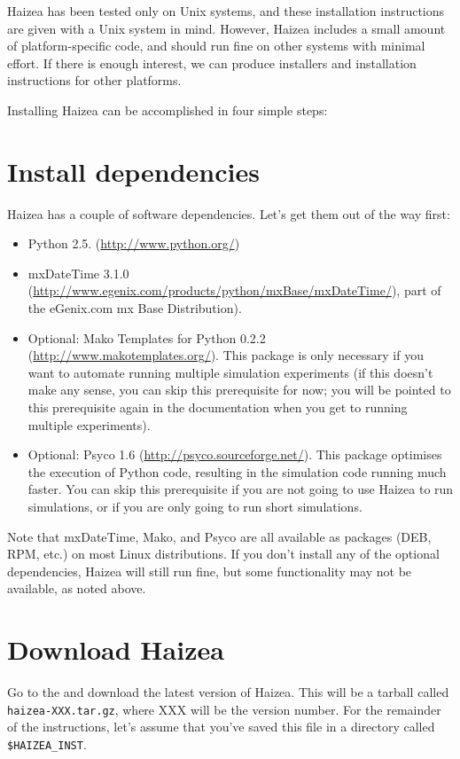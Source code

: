 Haizea has been tested only on Unix systems, and these installation instructions are given with a Unix system in mind. However, Haizea includes a small amount of platform-specific code, and should run fine on other systems with minimal effort. If there is enough interest, we can produce installers and installation instructions for other platforms.

Installing Haizea can be accomplished in four simple steps:

\section{Install dependencies}

Haizea has a couple of software dependencies. Let's get them out of the way first:

\begin{itemize}
\item Python 2.5. (\url{http://www.python.org/})
\item mxDateTime 3.1.0 (\url{http://www.egenix.com/products/python/mxBase/mxDateTime/}), part of the eGenix.com mx Base Distribution).
\item Optional: Mako Templates for Python 0.2.2 (\url{http://www.makotemplates.org/}). This package is only necessary if you want to automate running multiple simulation experiments (if this doesn't make any sense, you can skip this prerequisite for now; you will be pointed to this prerequisite again in the documentation when you get to running multiple experiments).
\item Optional: Psyco 1.6 (\url{http://psyco.sourceforge.net/}). This package optimises the execution of Python code, resulting in the simulation code running much faster. You can skip this prerequisite if you are not going to use Haizea to run simulations, or if you are only going to run short simulations.
\end{itemize}

Note that mxDateTime, Mako, and Psyco are all available as packages (DEB, RPM, etc.) on most Linux distributions. If you don't install any of the optional dependencies, Haizea will still run fine, but some functionality may not be available, as noted above.

\section{Download Haizea}

Go to the  and download the latest version of Haizea. This will be a tarball called \texttt{haizea-XXX.tar.gz}, where XXX will be the version number. For the remainder of the instructions, let's assume that you've saved this file in a directory called \texttt{\$HAIZEA\_INST}.

